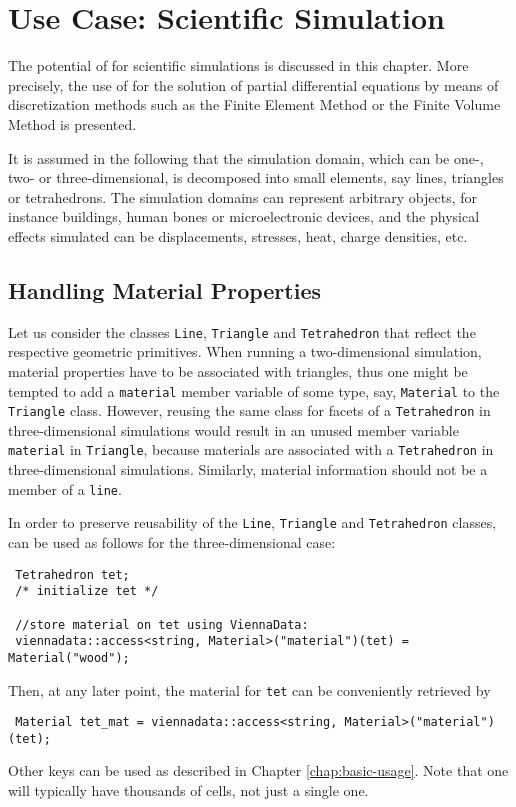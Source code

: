 \chapter{Use Case: Scientific Simulation} \label{chap:use-cases}
The potential of {\ViennaData} for scientific simulations is discussed in this chapter.
More precisely, the use of {\ViennaData} for the solution of partial differential equations by means of discretization methods such as the Finite Element Method or the Finite Volume Method is presented.

It is assumed in the following that the simulation domain, which can be one-, two- or three-dimensional, is decomposed into small elements, say lines, triangles or tetrahedrons. The simulation domains can represent arbitrary objects, for instance buildings, human bones or microelectronic devices, and the physical effects simulated can be displacements, stresses, heat, charge densities, etc. 

\section{Handling Material Properties}
Let us consider the classes \lstinline|Line|, \lstinline|Triangle| and \lstinline|Tetrahedron| that reflect the respective geometric primitives.
When running a two-dimensional simulation, material properties have to be associated with triangles, thus one might be tempted to add a \lstinline|material| member variable of some type, say, \lstinline|Material| to the \lstinline|Triangle| class. 
However, reusing the same class for facets of a \lstinline|Tetrahedron| in three-dimensional simulations would result in an unused
member variable \lstinline|material| in \lstinline|Triangle|, because materials are associated with a \lstinline|Tetrahedron| in three-dimensional simulations.
Similarly, material information should not be a member of a \lstinline|line|.

In order to preserve reusability of the \lstinline|Line|, \lstinline|Triangle| and \lstinline|Tetrahedron| classes, {\ViennaData} can be used as follows for the three-dimensional case:
\begin{lstlisting}
 Tetrahedron tet;
 /* initialize tet */

 //store material on tet using ViennaData:
 viennadata::access<string, Material>("material")(tet) = Material("wood"); 
\end{lstlisting}
Then, at any later point, the material for \lstinline|tet| can be conveniently retrieved by
\begin{lstlisting}
 Material tet_mat = viennadata::access<string, Material>("material")(tet); 
\end{lstlisting}
Other keys can be used as described in Chapter \ref{chap:basic-usage}. Note that one will typically have thousands of cells, not just a single one.

